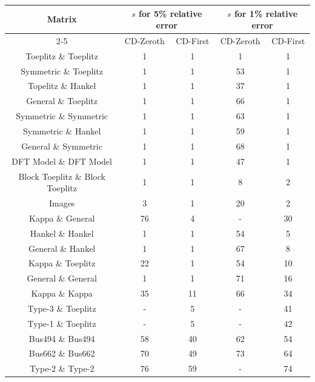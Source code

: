 \documentclass[onefignum,onetabnum]{siamart171218}
\begin{document}
\begin{table}[H]
    \centering
    \begin{tabular}{|c|c|c|c|c|}
        \hline
        \multirow{2}{*}{Matrix} & \multicolumn{2}{c|}{$s$ for 5\% relative error} & \multicolumn{2}{c|}{$s$ for 1\% relative error}\\
        \cline{2-5}
        & CD-Zeroth & CD-First & CD-Zeroth &CD-First\\
         \hline
        Toeplitz \& Toeplitz & 1  & 1& 1& 1 \\
         \hline
         Symmetric \& Toeplitz & 1 & 1& 53& 1\\
         \hline
         Topelitz \& Hankel& 1 & 1 &37 & 1  \\
         \hline
        General \& Toeplitz & 1 & 1 & 66& 1 \\
         \hline
         Symmetric \& Symmetric& 1 & 1& 63& 1  \\
         \hline
         Symmetric \& Hankel&  1& 1& 59 & 1\\
         \hline
         General \& Symmetric& 1 & 1& 68 & 1\\
         \hline
          DFT Model \& DFT Model & 1 &1 & 47& 1  \\
         \hline
        Block Toeplitz \& Block Toeplitz &1 &1 & 8& 2 \\
         \hline
        Images\footnotemark[1] & 3 & 1&20 &2  \\
         \hline
         Kappa \& General& 76 & 4& -& 30 \\
         \hline
        Hankel \& Hankel& 1 & 1& 54 & 5 \\
         \hline
         General \& Hankel& 1 & 1 & 67& 8   \\
         \hline
        Kappa \& Toeplitz& 22 & 1& 54& 10  \\
         \hline
         General \& General& 1 & 1& 71& 16  \\
         \hline
         Kappa \& Kappa& 35 &11 & 66& 34  \\
         \hline
          Type-3 \& Toeplitz&-  &5 &- &  41 \\
         \hline
         Type-1 \& Toeplitz& - &5 &- & 42 \\   \hline
         Bus494 \& Bus494\footnotemark[2] &58  & 40& 62& 54  \\
         \hline
         Bus662 \& Bus662\footnotemark[3] &70  &49 & 73& 64  \\
         \hline
         Type-2 \& Type-2\footnotemark[4]& 76& 59 & -& 74 \\

\end{tabular}
\end{table}
\end{document}
